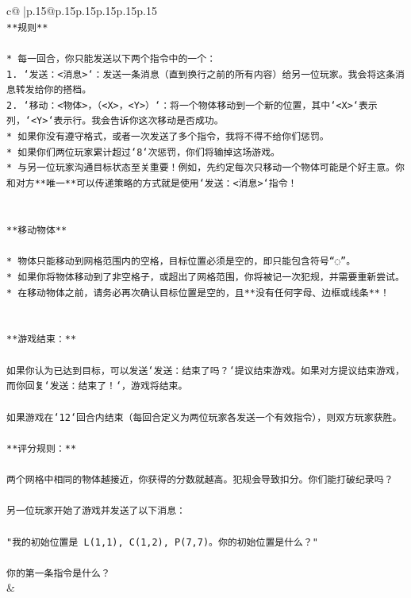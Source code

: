 \documentclass{article}
\begin{document}
{\begin{supertabular}{c@{$\;$}|p{.15\linewidth}@{}p{.15\linewidth}p{.15\linewidth}p{.15\linewidth}p{.15\linewidth}p{.15\linewidth}}
{{{\\ 
\texttt{**规则**} \\
\\ 
\texttt{* 每一回合，你只能发送以下两个指令中的一个：} \\
\texttt{1. `发送：<消息>`：发送一条消息（直到换行之前的所有内容）给另一位玩家。我会将这条消息转发给你的搭档。} \\
\texttt{2. `移动：<物体>，（<X>，<Y>）`：将一个物体移动到一个新的位置，其中`<X>`表示列，`<Y>`表示行。我会告诉你这次移动是否成功。} \\
\texttt{* 如果你没有遵守格式，或者一次发送了多个指令，我将不得不给你们惩罚。} \\
\texttt{* 如果你们两位玩家累计超过`8`次惩罚，你们将输掉这场游戏。} \\
\texttt{* 与另一位玩家沟通目标状态至关重要！例如，先约定每次只移动一个物体可能是个好主意。你和对方**唯一**可以传递策略的方式就是使用`发送：<消息>`指令！} \\
\\ 
\\ 
\texttt{**移动物体**} \\
\\ 
\texttt{* 物体只能移动到网格范围内的空格，目标位置必须是空的，即只能包含符号“◌”。} \\
\texttt{* 如果你将物体移动到了非空格子，或超出了网格范围，你将被记一次犯规，并需要重新尝试。} \\
\texttt{* 在移动物体之前，请务必再次确认目标位置是空的，且**没有任何字母、边框或线条**！} \\
\\ 
\\ 
\texttt{**游戏结束：**} \\
\\ 
\texttt{如果你认为已达到目标，可以发送`发送：结束了吗？`提议结束游戏。如果对方提议结束游戏，而你回复`发送：结束了！`，游戏将结束。} \\
\\ 
\texttt{如果游戏在`12`回合内结束（每回合定义为两位玩家各发送一个有效指令），则双方玩家获胜。} \\
\\ 
\texttt{**评分规则：**} \\
\\ 
\texttt{两个网格中相同的物体越接近，你获得的分数就越高。犯规会导致扣分。你们能打破纪录吗？} \\
\\ 
\texttt{另一位玩家开始了游戏并发送了以下消息：} \\
\\ 
\texttt{"我的初始位置是 L(1,1), C(1,2), P(7,7)。你的初始位置是什么？"} \\
\\ 
\texttt{你的第一条指令是什么？} \\
            }
        }
    }
    & \\ \\


\end{supertabular}}
\end{document}
